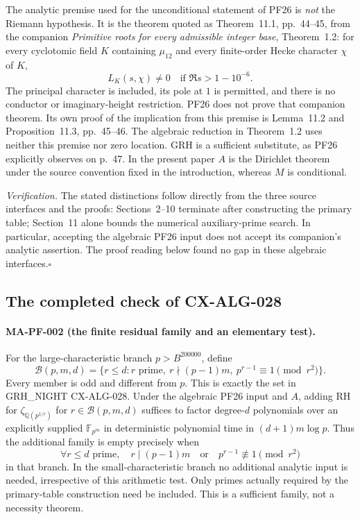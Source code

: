 The analytic premise used for the unconditional statement of PF26 is
\emph{not} the Riemann hypothesis. It is the theorem quoted as
Theorem~11.1, pp.~44--45, from the companion
\emph{Primitive roots for every admissible integer base}, Theorem~1.2:
for every cyclotomic field $K$ containing $\mu_{12}$ and every
finite-order Hecke character $\chi$ of $K$,
\[
 L_K(s,\chi)\ne0\quad\text{if }\Re s>1-10^{-6}.
 \tag{MA-PF-2}
\]
The principal character is included, its pole at $1$ is permitted, and
there is no conductor or imaginary-height restriction. PF26 does not
prove that companion theorem. Its own proof of the implication from
this premise is Lemma~11.2 and Proposition~11.3, pp.~45--46. The
algebraic reduction in Theorem~1.2 uses neither this premise nor zero
location. GRH is a sufficient substitute, as PF26 explicitly observes
on p.~47. In the present paper $A$ is the Dirichlet theorem under the
source convention fixed in the introduction, whereas $M$ is conditional.

\emph{Verification.} The stated distinctions follow directly from the
three source interfaces and the proofs: Sections~2--10 terminate after
constructing the primary table; Section~11 alone bounds the numerical
auxiliary-prime search. In particular, accepting the algebraic PF26
input does not accept its companion's analytic assertion. The proof
reading below found no gap in these algebraic interfaces.\hfill$\square$

\subsection{The completed check of CX-ALG-028}

\paragraph{MA-PF-002 (the finite residual family and an elementary test).}
For the large-characteristic branch $p>B^{200000}$, define
\[
 \mathcal B(p,m,d)=
 \{r\le d:r\text{ prime},\ r\nmid(p-1)m,
              \ p^{r-1}\equiv1\pmod{r^2}\}.
 \tag{MA-PF-3}
\]
Every member is odd and different from $p$. This is exactly the set in
GRH\_NIGHT CX-ALG-028. Under the algebraic PF26 input and $A$, adding
RH for $\zeta_{\mathbb Q(p^{1/r})}$ for $r\in\mathcal B(p,m,d)$
suffices to factor degree-$d$ polynomials over an explicitly supplied
$\mathbb F_{p^m}$ in deterministic polynomial time in
$(d+1)m\log p$. Thus the additional family is empty precisely when
\[
 \forall r\le d\text{ prime},\quad
 r\mid(p-1)m\quad\text{or}\quad p^{r-1}\not\equiv1\pmod{r^2}
 \tag{MA-PF-4}
\]
in that branch. In the small-characteristic branch no additional
analytic input is needed, irrespective of this arithmetic test.
Only primes actually required by the primary-table construction need
be included. This is a sufficient family, not a necessity theorem.

